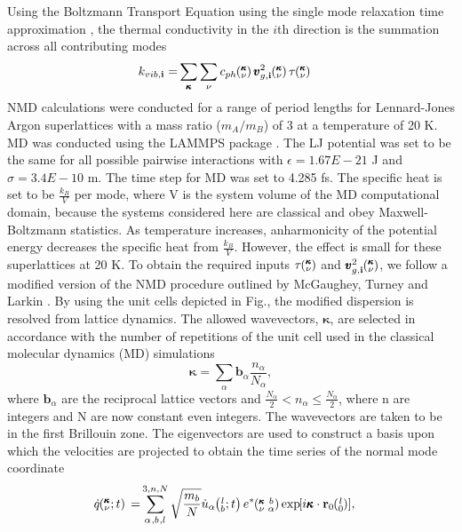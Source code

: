 \documentclass[aps,prb,preprint,preprintnumbers,amsmath,amssymb,floatfix,superscriptaddress]{revtex4}
\newcommand{\EXP}[1]{\exp\mspace{-5.0mu}\left[#1\right]\mspace{-3.0mu}}
\newcommand{\SUM}[2]{\ifthenelse{\equal{#1}{0}}{\sum_{
\alpha_{#2},b_{#2},l_{#2}}^{3,n,N}} {\ifthenelse{\equal{#1}{1}}{\sum_{
\alpha_{#2},b_{#2}}^{3,n}}{\sum_{\pmb{\kappa}#2,\nu#2}^{N,3n}}}}
\newcommand{\ab}[2]{\mspace{-4.0mu}\left(\mspace{-8.0mu}
\begin{smallmatrix}&\ifthenelse{\equal{#1}{}}{a}{#1} \\&\ifthenelse
{\equal{#2}{}}{b}{#2}\end{smallmatrix}\mspace{-3.0mu}\right)}
\newcommand{\kvba}{\mspace{-4.0mu}\left(\mspace{-8.0mu}
\begin{smallmatrix} &\pmb{\kappa} &b \\ &\nu &\alpha\end{smallmatrix}
\mspace{-3.0mu}\right)}
\newcommand{\kvt}{\mspace{-4.0mu}\left(\mspace{-8.0mu}
\begin{smallmatrix}&\pmb{\kappa} \\&\nu\end{smallmatrix}
\mspace{-2.0mu};t\right)}
\newcommand{\kv}{\mspace{-4.0mu}\left(\mspace{-8.0mu}
\begin{smallmatrix}&\pmb{\kappa} \\&\nu\end{smallmatrix}
\mspace{-3.0mu}\right)}
\newcommand{\lbt}{\mspace{-4.0mu}\left(\mspace{-8.0mu}
\begin{smallmatrix}&l \\&b\end{smallmatrix}\mspace{-2.0mu};t\right)}
\begin{document}
Using the Boltzmann Transport Equation using the single mode relaxation time approximation \cite{ziman_electrons_2001}, the thermal conductivity in the $i$th direction is the summation across all contributing modes
\begin{equation}\label{EQ:M:conductivity}
\begin{split}
k_{vib,\mathbf{i}}=&\sum_{\pmb{\kappa}} \sum_\nu c_{ph}\kv 
\pmb{v}^{2}_{g,\mathbf{i}}\kv \tau\kv
\end{split}
\end{equation}
NMD calculations were conducted for a range of period lengths for Lennard-Jones Argon superlattices with a mass ratio ($m_A/m_B$) of 3 at a temperature of 20 K. MD was conducted using the LAMMPS package \cite{LAMMPS}. The LJ potential was set to be the same for all possible pairwise interactions with $\epsilon= 1.67E-21$ J and $\sigma= 3.4E-10$ m. The time step for MD was set to 4.285 fs. The specific heat is set to be $\frac{k_B}{V}$ per mode, where V is the system volume of the MD computational domain, because the systems considered here are classical and obey Maxwell-Boltzmann statistics. As temperature increases, anharmonicity of the potential energy decreases the specific heat from $\frac{k_B}{V}$. However, the effect is small for these superlattices at 20 K. To obtain the required inputs $\tau\kv$ and $\pmb{v}^{2}_{g,\mathbf{i}}\kv$, we follow a modified version of the NMD procedure outlined by McGaughey, Turney and Larkin \cite {PhysRevB.81.081411}. By using the unit cells depicted in Fig., the modified dispersion is resolved from lattice dynamics. The allowed wavevectors, $\pmb{\kappa}$, are selected in accordance with the number of repetitions of the unit cell used in the classical molecular dynamics (MD) simulations 
\begin{equation}\label{EQ:NMD:allowdkpt}
\pmb{\kappa} = \sum_{\alpha} \pmb{b}_{\alpha} \frac{n_{\alpha}}{N_{\alpha}},
\end{equation}
where $\pmb{b}_\alpha$ are the reciprocal lattice vectors and $ \frac{N_\alpha}{2} < n_\alpha \le \frac {N_\alpha}{2}$, where n are integers and N are now constant even integers. The wavevectors are taken to be in the first Brillouin zone. The eigenvectors are used to construct a basis upon which the velocities are projected to obtain the time series of the normal mode coordinate 
\begin{equation}\label{EQ:NMD:qdot}
\begin{split}
\dot{q}\kvt{}{}{}=&\SUM{0}{}\sqrt{\frac{m_b}{N}}\dot{u}_{\alpha}\lbt e^*\kvba\EXP{i\pmb{\kappa}\cdot\mathbf{r}_0\ab{l}{0}},
\end{split}
\end{equation}
\end{document}
